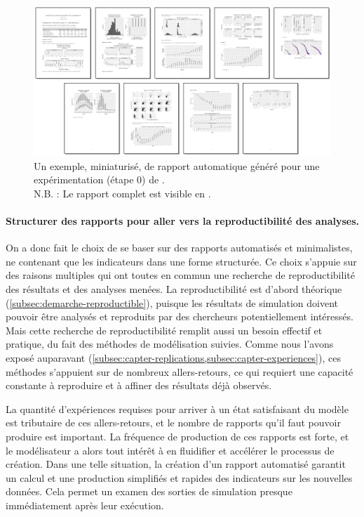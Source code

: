 \begin{figure}[H]
	\captionsetup{width=\linewidth}
	\includegraphics[width=\linewidth]{img/SimFeodal_Rapport_exemple.png}
	\caption[Un exemple de rapport automatique généré pour \simfeodal{}.]{Un exemple, miniaturisé, de rapport automatique généré pour une expérimentation (étape 0) de \simfeodal{}.\\
		N.B. : Le rapport complet est visible en .}
	\label{fig:simfeodal_rapport_mini}
\end{figure}


\paragraph{Structurer des rapports pour aller vers la reproductibilité des analyses.}

On a donc fait le choix de se baser sur des rapports automatisés et minimalistes, ne contenant que les indicateurs dans une forme structurée.
Ce choix s'appuie sur des raisons multiples qui ont toutes en commun une recherche de reproductibilité des résultats et des analyses menées.
La reproductibilité est d'abord théorique (\cref{subsec:demarche-reproductible}), puisque les résultats de simulation doivent pouvoir être analysés et reproduits par des chercheurs potentiellement intéressés.
Mais cette recherche de reproductibilité remplit aussi un besoin effectif et pratique, du fait des méthodes de modélisation suivies.
Comme nous l'avons exposé auparavant (\cref{subsec:capter-replications,subsec:capter-experiences}), ces méthodes s'appuient sur de nombreux allers-retours, ce qui requiert une capacité constante à reproduire et à affiner des résultats déjà observés.

La quantité d'expériences requises pour arriver à un état satisfaisant du modèle est tributaire de ces allers-retours, et le nombre de rapports qu'il faut pouvoir produire est important.
La fréquence de production de ces rapports est forte, et le modélisateur a alors tout intérêt à en fluidifier et accélérer le processus de création.
Dans une telle situation, la création d'un rapport automatisé garantit un calcul et une production simplifiés et rapides des indicateurs sur les nouvelles données.
Cela permet un examen des sorties de simulation presque immédiatement après leur exécution.

